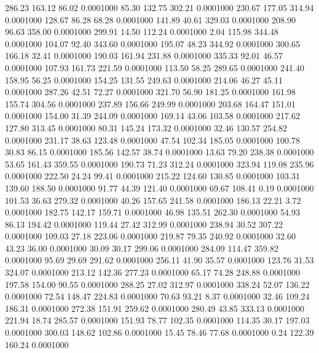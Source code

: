  286.23  163.12   86.02   0.0001000
  85.30  132.75  302.21   0.0001000
 230.67  177.05  314.94   0.0001000
 128.67   86.28   68.28   0.0001000
 141.89   40.61  329.03   0.0001000
 208.90   96.63  358.00   0.0001000
 299.91   14.50  112.24   0.0001000
   2.04  115.98  344.48   0.0001000
 104.07   92.40  343.60   0.0001000
 195.07   48.23  344.92   0.0001000
 300.65  166.18   32.41   0.0001000
 190.03  161.94  231.88   0.0001000
 335.33   92.01   46.57   0.0001000
 107.93  161.73  221.59   0.0001000
 113.50   58.25  289.65   0.0001000
 241.40  158.95   56.25   0.0001000
 154.25  131.55  249.63   0.0001000
 214.06   46.27   45.11   0.0001000
 287.26   42.51   72.27   0.0001000
 321.70   56.90  181.25   0.0001000
 161.98  155.74  304.56   0.0001000
 237.89  156.66  249.99   0.0001000
 203.68  164.47  151.01   0.0001000
 154.00   31.39  244.09   0.0001000
 169.14   43.06  103.58   0.0001000
 217.62  127.80  313.45   0.0001000
  80.31  145.24  173.32   0.0001000
  32.46  130.57  254.82   0.0001000
 231.17   38.63  123.48   0.0001000
  47.54  102.34  185.05   0.0001000
 100.78   30.83   86.15   0.0001000
 185.56  142.57   38.74   0.0001000
  13.63   79.20  238.38   0.0001000
  53.65  161.43  359.55   0.0001000
 190.73   71.23  312.24   0.0001000
 323.94  119.08  235.96   0.0001000
 222.50   24.24   99.41   0.0001000
 215.22  124.60  130.85   0.0001000
 103.31  139.60  188.50   0.0001000
  91.77   44.39  121.40   0.0001000
  69.67  108.41    0.19   0.0001000
 101.53   36.63  279.32   0.0001000
  40.26  157.65  241.58   0.0001000
 186.13   22.21    3.72   0.0001000
 182.75  142.17  159.71   0.0001000
  46.98  135.51  262.30   0.0001000
  54.93   86.13  194.42   0.0001000
 119.44   27.42  312.99   0.0001000
 238.94   30.52  307.22   0.0001000
 109.03   27.18  223.06   0.0001000
 219.87   79.35  240.92   0.0001000
  32.60   43.23   36.00   0.0001000
  30.09   30.17  299.06   0.0001000
 284.09  114.47  359.82   0.0001000
  95.69   29.69  291.62   0.0001000
 256.11   41.90   35.57   0.0001000
 123.76   31.53  324.07   0.0001000
 213.12  142.36  277.23   0.0001000
  65.17   74.28  248.88   0.0001000
 197.58  154.00   90.55   0.0001000
 288.25   27.02  312.97   0.0001000
 338.24   52.07  136.22   0.0001000
  72.54  148.47  224.83   0.0001000
  70.63   93.21    8.37   0.0001000
  32.46  109.24  186.31   0.0001000
 272.38  151.91  259.62   0.0001000
 280.49   43.85  333.13   0.0001000
 221.94   18.74  285.57   0.0001000
 151.93   78.77  102.35   0.0001000
 114.35   30.17  197.03   0.0001000
 300.03  148.62  102.86   0.0001000
  15.45   78.46   77.68   0.0001000
   0.24  122.39  160.24   0.0001000
